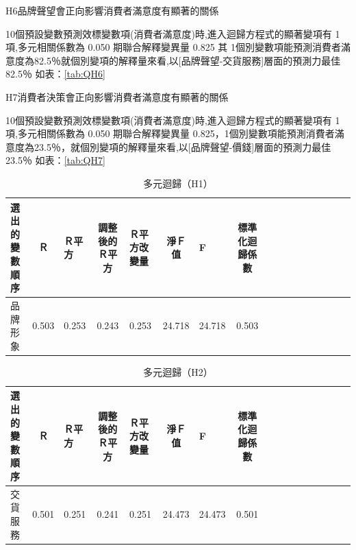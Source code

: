 \begin{enumerate}

H6品牌聲望會正向影響消費者滿意度有顯著的關係

10個預設變數預測效標變數項(消費者滿意度)時,進入迴歸方程式的顯著變項有 1項,多元相關係數為 0.050 期聯合解釋變異量 0.825 其 1個別變數項能預測消費者滿意度為82.5％就個別變項的解釋量來看,以[品牌聲望-交貨服務]層面的預測力最佳82.5％ 如表：\ref{tab:QH6}


H7消費者決策會正向影響消費者滿意度有顯著的關係

10個預設變數預測效標變數項(消費者滿意度)時,進入迴歸方程式的顯著變項有 1項,多元相關係數為 0.050 期聯合解釋變異量 0.825，1個別變數項能預測消費者滿意度為23.5％，就個別變項的解釋量來看,以[品牌聲望-價錢]層面的預測力最佳23.5％ 如表：\ref{tab:QH7}


\end{enumerate}



\begin{table}[htb]
\caption{多元迴歸（H1）}
\label{tab:QH1}
\centering
\renewcommand{\arraystretch}{1} %
\arrayrulewidth=1pt               %
\tabcolsep=4pt                   %
\begin{tabular}[t]{lclclclclclclclcl}  %
\hline
選出的變數順序&Ｒ&Ｒ平方&調整後的Ｒ平方&Ｒ平方改變量&淨Ｆ值&F&標準化迴歸係數\\
\hline
品牌形象	&0.503	&0.253	&0.243	&0.253	&24.718	&24.718 &0.503\\
\hline
\end{tabular}
\end{table}


\begin{table}[htb]
\caption{多元迴歸（H2）}
\label{tab:QH2}
\centering
\renewcommand{\arraystretch}{1} %
\arrayrulewidth=1pt               %
\tabcolsep=4pt                   %
\begin{tabular}[t]{lclclclclclclclcl}  %
\hline
選出的變數順序&Ｒ&Ｒ平方&調整後的Ｒ平方&Ｒ平方改變量&淨Ｆ值&F&標準化迴歸係數\\
\hline
交貨服務&0.501&0.251&0.241&0.251&24.473&24.473&0.501\\
\hline
\end{tabular}
\end{table}

